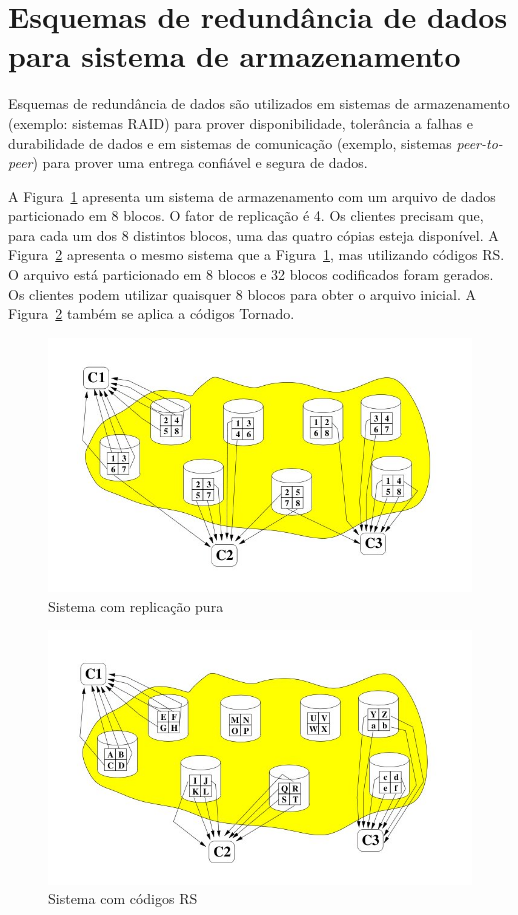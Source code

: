 \section{Esquemas de redundância de dados para sistema de armazenamento}

Esquemas de redundância de dados são utilizados em sistemas de armazenamento (exemplo: sistemas RAID) para prover disponibilidade, tolerância a falhas e durabilidade de dados e em sistemas de comunicação (exemplo, sistemas \emph{peer-to-peer}) para prover uma entrega confiável e segura de dados.

A Figura~\ref{fig4:srp} apresenta um sistema de armazenamento com um arquivo de dados particionado em 8 blocos. O fator de replicação é 4. Os clientes precisam que, para cada um dos 8 distintos blocos, uma das quatro cópias esteja disponível. A Figura~\ref{fig5:crs} apresenta o mesmo sistema que a Figura~\ref{fig4:srp}, mas utilizando códigos RS. O arquivo está particionado em 8 blocos e 32 blocos codificados foram gerados. Os clientes podem utilizar quaisquer 8 blocos para obter o arquivo inicial. A Figura~\ref{fig5:crs} também se aplica a códigos Tornado.

   \begin{figure}[h]
     \centering
     \includegraphics[scale=.6]{figuras/replicacao-pura.jpg}
     \caption{Sistema com replicação pura \cite{Plank:2004}}
     \label{fig4:srp}
   \end{figure}

   \begin{figure}[h]
     \centering
     \includegraphics[scale=.6]{figuras/codigos-RS.jpg}
     \caption{Sistema com códigos RS \cite{Plank:2004}}
     \label{fig5:crs}
   \end{figure}


